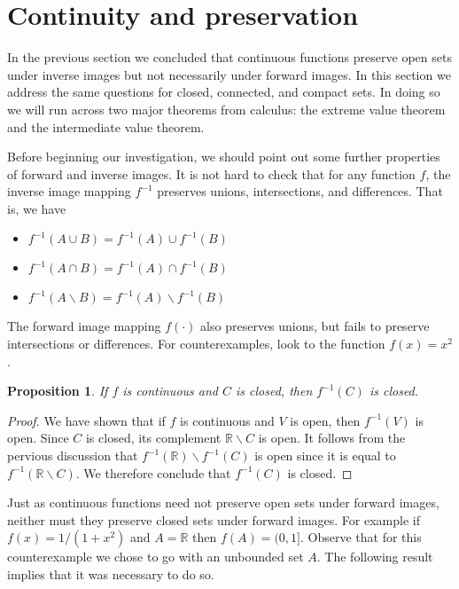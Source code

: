\documentclass[11pt,oneside]{amsbook}
\newcommand{\RR}{\mathbb R}
\theoremstyle{definition}
\theoremstyle{plain}
\newtheorem{prop}[thm]{Proposition}
\theoremstyle{definition}
\theoremstyle{remark}
\numberwithin{equation}{section}
\numberwithin{figure}{section}
\begin{document}
\section{Continuity and preservation}

In the previous section we concluded that continuous functions preserve open sets under inverse images but not necessarily under forward images. In this section we address the same questions for closed, connected, and compact sets. In doing so we will run across two major theorems from calculus: the extreme value theorem and the intermediate value theorem.

Before beginning our investigation, we should point out some further properties of forward and inverse images. It is not hard to check that for any function $f$, the inverse image mapping $f^{-1}$ preserves unions, intersections, and differences. That is, we have
\begin{itemize}
\item $f^{-1}(A\cup B)=f^{-1}(A)\cup f^{-1}(B)$
\item $f^{-1}(A\cap B)=f^{-1}(A)\cap f^{-1}(B)$
\item $f^{-1}(A\smallsetminus B)=f^{-1}(A)\smallsetminus f^{-1}(B)$
\end{itemize}
The forward image mapping $f(\cdot)$ also preserves unions, but fails to preserve intersections or differences. For counterexamples, look to the function $f(x)=x^2$.

\begin{prop}
  If $f$ is continuous and $C$ is closed, then $f^{-1}(C)$ is closed.
\end{prop}

\begin{proof}
  We have shown that if $f$ is continuous and $V$ is open, then $f^{-1}(V)$ is open. Since $C$ is closed, its complement $\RR\smallsetminus C$ is open. It follows from the pervious discussion that $f^{-1}(\RR)\smallsetminus f^{-1}(C)$ is open since it is equal to $f^{-1}(\RR\smallsetminus C)$. We therefore conclude that $f^{-1}(C)$ is closed.
\end{proof}

Just as continuous functions need not preserve open sets under forward images, neither must they preserve closed sets under forward images. For example if $f(x)=1/(1+x^2)$ and $A=\RR$ then $f(A)=(0,1]$. Observe that for this counterexample we chose to go with an unbounded set $A$. The following result implies that it was necessary to do so.
\end{document}
